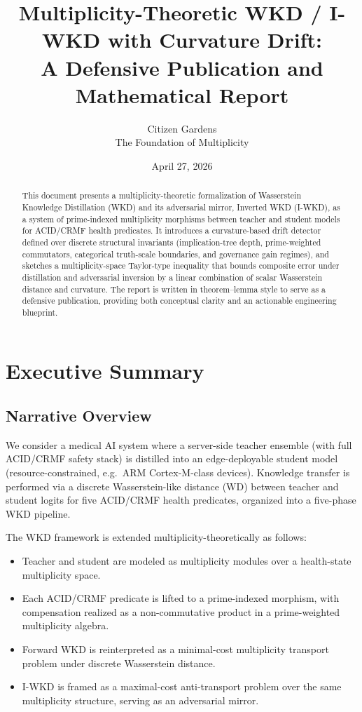 \documentclass[11pt]{article}
\title{Multiplicity-Theoretic WKD / I-WKD with Curvature Drift:\\
A Defensive Publication and Mathematical Report}
\author{Citizen Gardens \\ The Foundation of Multiplicity}
\date{April 27, 2026}
\theoremstyle{definition}
\theoremstyle{plain}
\theoremstyle{remark}
\begin{document}
\maketitle

\begin{abstract}
This document presents a multiplicity-theoretic formalization of Wasserstein Knowledge Distillation (WKD) and its adversarial mirror, Inverted WKD (I-WKD), as a system of prime-indexed multiplicity morphisms between teacher and student models for ACID/CRMF health predicates. It introduces a curvature-based drift detector defined over discrete structural invariants (implication-tree depth, prime-weighted commutators, categorical truth-scale boundaries, and governance gain regimes), and sketches a multiplicity-space Taylor-type inequality that bounds composite error under distillation and adversarial inversion by a linear combination of scalar Wasserstein distance and curvature. The report is written in theorem--lemma style to serve as a defensive publication, providing both conceptual clarity and an actionable engineering blueprint.
\end{abstract}
\newpage        
\tableofcontents
\newpage
\section{Executive Summary}

\subsection{Narrative Overview}

We consider a medical AI system where a server-side teacher ensemble (with full ACID/CRMF safety stack) is distilled into an edge-deployable student model (resource-constrained, e.g.\ ARM Cortex-M-class devices). Knowledge transfer is performed via a discrete Wasserstein-like distance (WD) between teacher and student logits for five ACID/CRMF health predicates, organized into a five-phase WKD pipeline.

The WKD framework is extended multiplicity-theoretically as follows:
\begin{itemize}[leftmargin=2em]
  \item Teacher and student are modeled as multiplicity modules over a health-state multiplicity space.
  \item Each ACID/CRMF predicate is lifted to a prime-indexed morphism, with compensation realized as a non-commutative product in a prime-weighted multiplicity algebra.
  \item Forward WKD is reinterpreted as a minimal-cost multiplicity transport problem under discrete Wasserstein distance.
  \item I-WKD is framed as a maximal-cost anti-transport problem over the same multiplicity structure, serving as an adversarial mirror.
\end{itemize}
\end{document}

